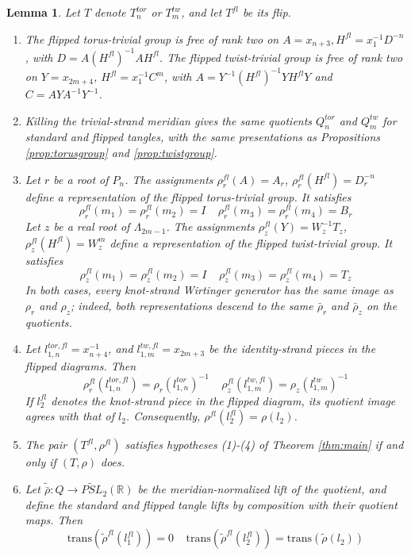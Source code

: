 \documentclass{article}
\theoremstyle{plain}
\theoremstyle{definition}
\theoremstyle{plain}
\theoremstyle{plain}
\theoremstyle{plain}
\newtheorem{lemma}[theorem]{Lemma}
\theoremstyle{remark}
\theoremstyle{remark}
\theoremstyle{plain}
\theoremstyle{plain}
\newcounter{main}
\theoremstyle{plain}
\theoremstyle{plain}
\begin{document}
\begin{lemma}\label{lma:flipgroups}
Let $T$ denote $T_n^{tor}$ or $T_m^{tw}$, and let $T^{fl}$ be its flip. 
\begin{enumerate}
	\item The flipped torus-trivial group is free of rank two on $A = x_{n+3}, H^{fl} = x_1^{-1}D^{-n}$, with $D = A(H^{fl})^{-1}AH^{fl}$. The flipped twist-trivial group is free of rank two on $Y = x_{2m+4}$, $H^{fl} = x_1^{-1}C^m$, with $A = Y^{-1}(H^{fl})^{-1}YH^{fl}Y$ and $C = AYA^{-1}Y^{-1}$.
	\item Killing the trivial-strand meridian gives the same quotients $Q_n^{tor}$ and $Q_m^{tw}$ for standard and flipped tangles, with the same presentations as Propositions \ref{prop:torusgroup} and \ref{prop:twistgroup}. 
	\item Let $r$ be a root of $P_n$. The assignments $\rho_r^{fl}(A) = A_r$, $\rho_r^{fl}(H^{fl}) = D_r^{-n}$ define a representation of the flipped torus-trivial group. It satisfies 
	\begin{equation*}
		\rho_r^{fl}(m_1) = \rho_r^{fl}(m_2) = I \ \ \ \ \ \rho_r^{fl}(m_3) = \rho_r^{fl}(m_4) = B_r
	\end{equation*} Let $z$ be a real root of $\Lambda_{2m-1}$. The assignments $\rho_z^{fl}(Y) = W_z^{-1}T_z$, $\rho_z^{fl}(H^{fl}) = W_z^m$ define a representation of the flipped twist-trivial group. It satisfies 
	\begin{equation*}
		\rho_z^{fl}(m_1) = \rho_z^{fl}(m_2) = I \ \ \ \ \ \rho_z^{fl}(m_3) = \rho_z^{fl}(m_4) = T_z
	\end{equation*}
	In both cases, every knot-strand Wirtinger generator has the same image as $\rho_r$ and $\rho_z$; indeed, both representations descend to the same $\bar\rho_r$ and $\bar\rho_z$ on the quotients. 
	\item Let $l_{1,n}^{tor, fl} = x_{n+4}^{-1}$, and $l_{1,m}^{tw, fl} = x_{2m+3}$ be the identity-strand pieces in the flipped diagrams. Then 
	\begin{equation*}
		\rho_r^{fl}(l_{1,n}^{tor,fl}) = \rho_r(l_{1,n}^{tor})^{-1} \ \ \ \ \ \rho_z^{fl}(l_{1,m}^{tw, fl}) = \rho_z(l_{1,m}^{tw})^{-1}
	\end{equation*}
	If $l_2^{fl}$ denotes the knot-strand piece in the flipped diagram, its quotient image agrees with that of $l_2$. Consequently, $\rho^{fl}(l_2^{fl}) = \rho(l_2)$. 
	\item The pair $(T^{fl}, \rho^{fl})$ satisfies hypotheses (1)-(4) of Theorem \ref{thm:main} if and only if $(T, \rho)$ does. 
	\item Let $\widetilde{\bar\rho}: Q \to \widetilde{PSL}_2(\mathbb R)$ be the meridian-normalized lift of the quotient, and define the standard and flipped tangle lifts by composition with their quotient maps. Then 
	\begin{equation*}
		\mathrm{trans}(\widetilde\rho^{fl}(l_1^{fl})) = 0 \ \ \ \ \ \mathrm{trans}(\widetilde\rho^{fl}(l_2^{fl})) = \mathrm{trans}(\widetilde\rho(l_2))
	\end{equation*} 
\end{enumerate}
\end{lemma}
\end{document}
